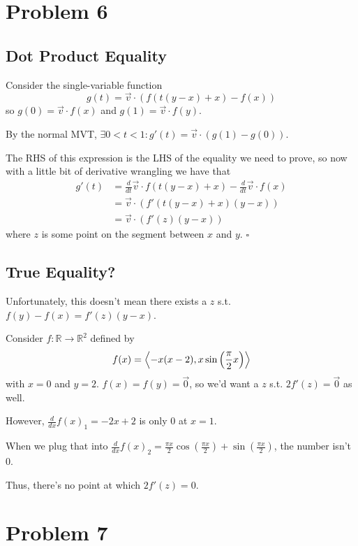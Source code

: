 \documentclass[12pt]{article}
\newcommand{\R}{\mathbb{R}}
\begin{document}
\pagebreak

\section{Problem 6}

\subsection{Dot Product Equality}

Consider the single-variable function
\[g(t)=\vec{v} \cdot (f(t(y-x)+x)-f(x))\]
so $g(0)=\vec{v} \cdot f(x)$ and $g(1)=\vec{v} \cdot f(y)$.

By the normal MVT, $\exists 0 < t < 1: g'(t)=\vec{v} \cdot (g(1)-g(0))$.

The RHS of this expression is the LHS of the equality we need to prove,
so now with a little bit of derivative wrangling we have that
\begin{align*}
  g'(t)
   & = \frac{d}{dt} \vec{v} \cdot f(t(y-x)+x) - \frac{d}{dt} \vec{v} \cdot f(x) \\
   & = \vec{v} \cdot (f'(t(y-x)+x)(y-x))                                        \\
   & = \vec{v} \cdot (f'(z)(y-x))
\end{align*}
where $z$ is some point on the segment between $x$ and $y$. $\square$

\subsection{True Equality?}

Unfortunately, this doesn't mean there exists a $z$ s.t. $f(y)-f(x)=f'(z)(y-x)$.

Consider $f: \R \to \R^2$ defined by
\[f(x)=\Braket{-x(x-2), x\sin\left(\frac{\pi}{2}x\right)}\]
with $x=0$ and $y=2$.
$f(x)=f(y)=\vec{0}$, so we'd want a $z$ s.t. $2f'(z)=\vec{0}$ as well.

However, $\frac{d}{dx} f(x)_1=-2x+2$ is only $0$ at $x=1$.

When we plug that into
$\frac{d}{dx} f(x)_2=\frac{\pi x}{2}\cos\left(\frac{\pi x}{2}\right)+\sin\left(\frac{\pi x}{2}\right)$,
the number isn't $0$.

Thus, there's no point at which $2f'(z)=0$.

\pagebreak

\section{Problem 7}
\end{document}

